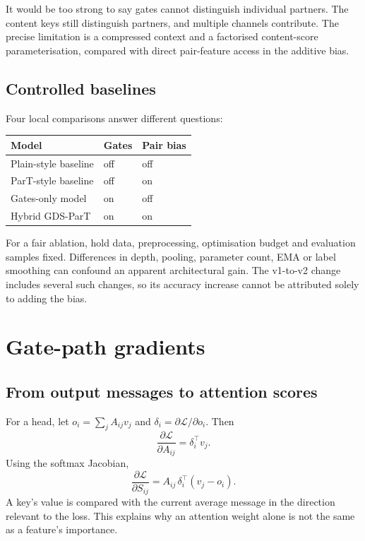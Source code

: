 \documentclass[11pt,a4paper]{article}
\numberwithin{equation}{section}
\begin{document}
It would be too strong to say gates cannot distinguish individual partners.
The content keys still distinguish partners, and multiple channels
contribute. The precise limitation is a compressed context and a
factorised content-score parameterisation, compared with direct
pair-feature access in the additive bias.

\subsection{Controlled baselines}
Four local comparisons answer different questions:
\begin{center}
\begin{tabular}{lll}
\toprule Model & Gates & Pair bias\\ \midrule
Plain-style baseline & off & off\\
ParT-style baseline & off & on\\
Gates-only model & on & off\\
Hybrid GDS-ParT & on & on\\
\bottomrule
\end{tabular}
\end{center}
For a fair ablation, hold data, preprocessing, optimisation budget and
evaluation samples fixed. Differences in depth, pooling, parameter count,
EMA or label smoothing can confound an apparent architectural gain.
The v1-to-v2 change includes several such changes, so its accuracy increase
cannot be attributed solely to adding the bias.

\section{Gate-path gradients}
\subsection{From output messages to attention scores}
For a head, let $o_i=\sum_j A_{ij}v_j$ and
$\delta_i=\partial\mathcal L/\partial o_i$. Then
\[
 \frac{\partial\mathcal L}{\partial A_{ij}}=\delta_i^\top v_j.
\]
Using the softmax Jacobian,
\begin{equation}\label{eq:scoregrad}
 \frac{\partial\mathcal L}{\partial S_{ij}}
 =A_{ij}\,\delta_i^\top(v_j-o_i).
\end{equation}
A key's value is compared with the current average message in the
direction relevant to the loss. This explains why an attention weight
alone is not the same as a feature's importance.
\end{document}
